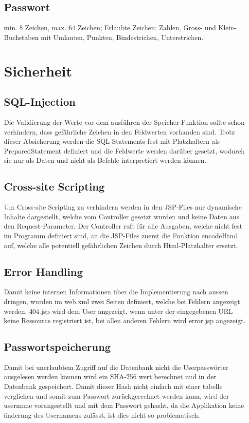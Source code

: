 \documentclass[12pt]{scrartcl}
\begin{document}
\newpage
\subsection{Passwort}
min. 8 Zeichen, max. 64 Zeichen; Erlaubte Zeichen: Zahlen, Gross- und Klein-Buchstaben mit Umlauten, Punkten, Bindestrichen, Unterstrichen.


\newpage
\section{Sicherheit}
\subsection{SQL-Injection}
Die Validierung der Werte vor dem ausführen der Speicher-Funktion sollte schon verhindern, dass gefährliche Zeichen in den Feldwerten vorhanden sind. Trotz dieser Absicherung werden die SQL-Statements fest mit Platzhaltern als PreparedStatement definiert und die Feldwerte werden darüber gesetzt, wodurch sie nur als Daten und nicht als Befehle interpretiert werden können.

\newpage
\subsection{Cross-site Scripting}
Um Cross-site Scripting zu verhindern werden in den JSP-Files nur dynamische Inhalte dargestellt, welche vom Controller gesetzt wurden und keine Daten aus den Request-Parameter. Der Controller ruft für alle Ausgaben, welche nicht fest im Programm definiert sind, an die JSP-Files zuerst die Funktion encodeHtml auf, welche alle potentiell gefährlichen Zeichen durch Html-Platzhalter ersetzt.

\subsection{Error Handling}
Damit keine internen Informationen über die Implementierung nach aussen dringen, wurden im web.xml zwei Seiten definiert, welche bei Fehlern angezeigt werden. 404.jsp wird dem User angezeigt, wenn unter der eingegebenen URL keine Ressource registriert ist, bei allen anderen Fehlern wird error.jsp angezeigt.

\subsection{Passwortspeicherung}
Damit bei unerlaubtem Zugriff auf die Datenbank nicht die Userpasswörter ausgelesen werden können wird ein SHA-256 wert berechnet und in der Datenbank gespeichert. Damit dieser Hash nicht einfach mit einer tabelle verglichen und somit zum Passwort zurückgerechnet werden kann, wird der username vorangestellt und mit dem Passwort gehasht, da die Applikation keine änderung des Usernamens zulässt, ist dies nicht so problematisch.
\end{document}
